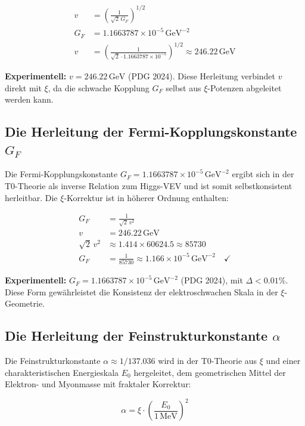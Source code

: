 	\begin{align}
		v &= \left( \frac{1}{\sqrt{2} \, G_F} \right)^{1/2} \\
		G_F &= 1.1663787 \times 10^{-5} \,\si{\giga\electronvolt\tothe{-2}} \\
		v &= \left( \frac{1}{\sqrt{2} \cdot 1.1663787 \times 10^{-5}} \right)^{1/2} \approx 246.22 \,\si{\giga\electronvolt}
	\end{align}
	
	\textbf{Experimentell:} $v = 246.22\,\si{\giga\electronvolt}$ (PDG 2024). Diese Herleitung verbindet $v$ direkt mit $\xi$, da die schwache Kopplung $G_F$ selbst aus $\xi$-Potenzen abgeleitet werden kann.
	\subsection{Die Herleitung der Fermi-Kopplungskonstante $G_F$}
	Die Fermi-Kopplungskonstante $G_F = 1.1663787 \times 10^{-5} \,\si{\giga\electronvolt\tothe{-2}}$ ergibt sich in der T0-Theorie als inverse Relation zum Higgs-VEV und ist somit selbstkonsistent herleitbar. Die $\xi$-Korrektur ist in höherer Ordnung enthalten:
	
	\begin{align}
		G_F &= \frac{1}{\sqrt{2} \, v^2} \\
		v &= 246.22 \,\si{\giga\electronvolt} \\
		\sqrt{2} \, v^2 &\approx 1.414 \times 60624.5 \approx 85730 \\
		G_F &= \frac{1}{85730} \approx 1.166 \times 10^{-5} \,\si{\giga\electronvolt\tothe{-2}} \quad \checkmark
	\end{align}
	
	\textbf{Experimentell:} $G_F = 1.1663787 \times 10^{-5} \,\si{\giga\electronvolt\tothe{-2}}$ (PDG 2024), mit $\Delta < 0.01\%$. Diese Form gewährleistet die Konsistenz der elektroschwachen Skala in der $\xi$-Geometrie.
	\subsection{Die Herleitung der Feinstrukturkonstante $\alpha$}
	Die Feinstrukturkonstante $\alpha \approx 1/137.036$ wird in der T0-Theorie aus $\xi$ und einer charakteristischen Energieskala $E_0$ hergeleitet, dem geometrischen Mittel der Elektron- und Myonmasse mit fraktaler Korrektur:
	
	\begin{equation}
		\alpha = \xi \cdot \left( \frac{E_0}{1\,\si{\mega\electronvolt}} \right)^2
	\end{equation}
	
